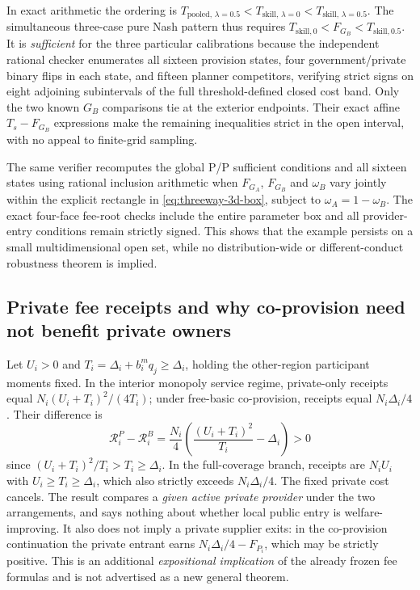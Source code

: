 In exact arithmetic the ordering is $T_{\mathrm{pooled},\,\lambda=0.5}<T_{\mathrm{skill},\,\lambda=0}<T_{\mathrm{skill},\,\lambda=0.5}$. The simultaneous three-case pure Nash pattern thus requires $T_{\mathrm{skill},0}<F_{G_B}<T_{\mathrm{skill},0.5}$. It is \emph{sufficient} for the three particular calibrations because the independent rational checker enumerates all sixteen provision states, four government/private binary flips in each state, and fifteen planner competitors, verifying strict signs on eight adjoining subintervals of the full threshold-defined closed cost band. Only the two known $G_B$ comparisons tie at the exterior endpoints. Their exact affine $T_s-F_{G_B}$ expressions make the remaining inequalities strict in the open interval, with no appeal to finite-grid sampling.

The same verifier recomputes the global P/P sufficient conditions and all sixteen states using rational inclusion arithmetic when $F_{G_A}$, $F_{G_B}$ and $\omega_B$ vary jointly within the explicit rectangle in \eqref{eq:threeway-3d-box}, subject to $\omega_A=1-\omega_B$. The exact four-face fee-root checks include the entire parameter box and all provider-entry conditions remain strictly signed. This shows that the example persists on a small multidimensional open set, while no distribution-wide or different-conduct robustness theorem is implied.

\subsection{Private fee receipts and why co-provision need not benefit private owners}
Let $U_i>0$ and $T_i=\Delta_i+b_i^m q_j\geq\Delta_i$, holding the other-region participant moments fixed. In the interior monopoly service regime, private-only receipts equal
$N_i(U_i+T_i)^2/(4T_i)$; under free-basic co-provision, receipts equal $N_i\Delta_i/4$. Their difference is
\begin{equation}
 \mathcal R_i^P-\mathcal R_i^B
 =\frac{N_i}{4}\left(\frac{(U_i+T_i)^2}{T_i}-\Delta_i\right)
 >0
\end{equation}
since $(U_i+T_i)^2/T_i>T_i\geq\Delta_i$. In the full-coverage branch, receipts are $N_iU_i$ with $U_i\geq T_i\geq\Delta_i$, which also strictly exceeds $N_i\Delta_i/4$. The fixed private cost cancels. The result compares a \emph{given active private provider} under the two arrangements, and says nothing about whether local public entry is welfare-improving. It also does not imply a private supplier exits: in the co-provision continuation the private entrant earns $N_i\Delta_i/4-F_{P_i}$, which may be strictly positive. This is an additional \emph{expositional implication} of the already frozen fee formulas and is not advertised as a new general theorem.

